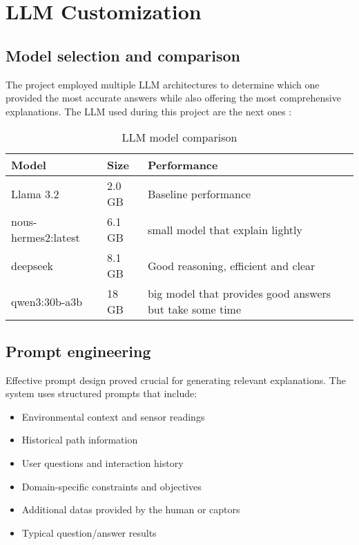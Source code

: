 \section{LLM Customization}

\subsection{Model selection and comparison}

The project employed multiple LLM architectures to determine which one provided the most accurate answers while also offering the most comprehensive explanations.
The LLM used during this project are the next ones :
\begin{table}[ht]
    \centering
    \begin{tabular}{|l|l|l|}
        \hline
        \textbf{Model}      & \textbf{Size} & \textbf{Performance} \\
        \hline
        Llama 3.2           & 2.0 GB        & Baseline performance \\
        nous-hermes2:latest & 6.1 GB        & small model that explain lightly \\
        deepseek            & 8.1 GB        & Good reasoning, efficient and clear\\
        qwen3:30b-a3b       & 18 GB         & big model that provides good answers but take some time \\
        \hline
    \end{tabular}
    \caption{LLM model comparison}
\end{table}

\subsection{Prompt engineering}

Effective prompt design proved crucial for generating relevant explanations. The system uses structured prompts that include:
\begin{itemize}
    \item Environmental context and sensor readings
    \item Historical path information
    \item User questions and interaction history
    \item Domain-specific constraints and objectives
    \item Additional datas provided by the human or captors
    \item Typical question/answer results
\end{itemize}

